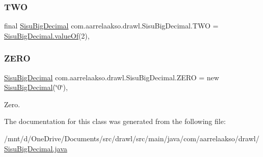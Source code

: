 \mbox{\label{classcom_1_1aarrelaakso_1_1drawl_1_1_sisu_big_decimal_a31b16f357b73bac1eef7b45326887b23}} 
\subsubsection{\texorpdfstring{T\+WO}{TWO}}
{\footnotesize\ttfamily final \hyperlink{classcom_1_1aarrelaakso_1_1drawl_1_1_sisu_big_decimal}{Sisu\+Big\+Decimal} com.\+aarrelaakso.\+drawl.\+Sisu\+Big\+Decimal.\+T\+WO = \hyperlink{classcom_1_1aarrelaakso_1_1drawl_1_1_sisu_big_decimal_a076ac8cd04ac04e39f7f3fcc7ce9a4a1}{Sisu\+Big\+Decimal.\+value\+Of}(2)\hspace{0.3cm}{\ttfamily [static]}, {\ttfamily [protected]}}

\mbox{\label{classcom_1_1aarrelaakso_1_1drawl_1_1_sisu_big_decimal_a5722f4f25f56502bda610b56ec3857be}} 
\subsubsection{\texorpdfstring{Z\+E\+RO}{ZERO}}
{\footnotesize\ttfamily \hyperlink{classcom_1_1aarrelaakso_1_1drawl_1_1_sisu_big_decimal}{Sisu\+Big\+Decimal} com.\+aarrelaakso.\+drawl.\+Sisu\+Big\+Decimal.\+Z\+E\+RO = new \hyperlink{classcom_1_1aarrelaakso_1_1drawl_1_1_sisu_big_decimal}{Sisu\+Big\+Decimal}(\char`\"{}0\char`\"{})\hspace{0.3cm}{\ttfamily [static]}, {\ttfamily [protected]}}

Zero. 

The documentation for this class was generated from the following file\+:\begin{DoxyCompactItemize}
\item 
/mnt/d/\+One\+Drive/\+Documents/src/drawl/src/main/java/com/aarrelaakso/drawl/\hyperlink{_sisu_big_decimal_8java}{Sisu\+Big\+Decimal.\+java}\end{DoxyCompactItemize}
